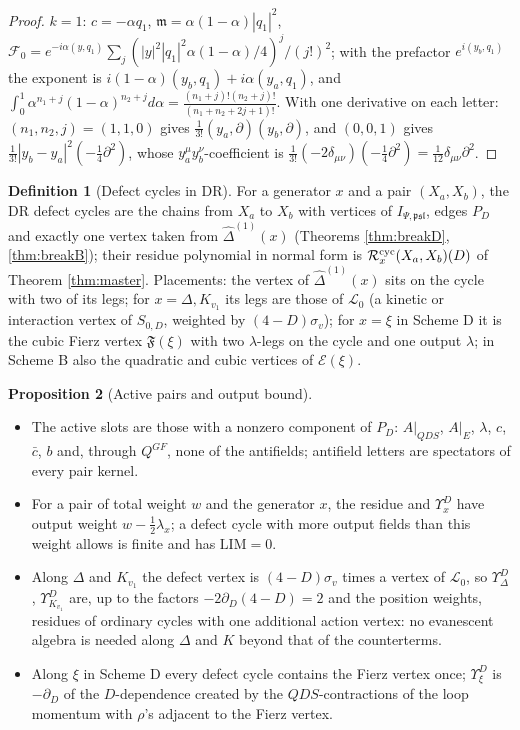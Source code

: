 \documentclass[11pt]{article}
\theoremstyle{definition}
\newtheorem{definition}{Definition}[section]
\newtheorem{proposition}[definition]{Proposition}
\numberwithin{equation}{section}
\begin{document}
\begin{proof}
$k=1$: $c=-\alpha q_1$, $\mathfrak m=\alpha(1-\alpha)|q_1|^2$, $\mathcal F_0=e^{-i\alpha(y,q_1)}\sum_j(|y|^2|q_1|^2\alpha(1-\alpha)/4)^j/(j!)^2$; with the prefactor $e^{i(y_b,q_1)}$ the exponent is $i(1-\alpha)(y_b,q_1)+i\alpha(y_a,q_1)$, and $\int_0^1\alpha^{n_1+j}(1-\alpha)^{n_2+j}d\alpha=\frac{(n_1+j)!(n_2+j)!}{(n_1+n_2+2j+1)!}$. With one derivative on each letter: $(n_1,n_2,j)=(1,1,0)$ gives $\frac1{3!}(y_a,\partial)(y_b,\partial)$, and $(0,0,1)$ gives $\frac1{3!}|y_b-y_a|^2(-\frac14\partial^2)$, whose $y_a^\mu y_b^\nu$-coefficient is $\frac1{3!}(-2\delta_{\mu\nu})(-\frac14\partial^2)=\frac1{12}\delta_{\mu\nu}\partial^2$.
\end{proof}

\begin{definition}[Defect cycles in DR]
\label{def:defcyc}
For a generator $x$ and a pair $(X_a,X_b)$, the DR defect cycles are the chains from $X_a$ to $X_b$ with vertices of $I_{\Psi,\mathfrak{psl}}$, edges $P_D$ and exactly one vertex taken from $\widehat\Delta^{(1)}(x)$ (Theorems \ref{thm:breakD}, \ref{thm:breakB}); their residue polynomial in normal form is $\mathcal R^{\rm cyc}_x(X_a,X_b)(D)$ of Theorem \ref{thm:master}. Placements: the vertex of $\widehat\Delta^{(1)}(x)$ sits on the cycle with two of its legs; for $x=\Delta,K_{v_1}$ its legs are those of $\mathscr L_0$ (a kinetic or interaction vertex of $S_{0,D}$, weighted by $(4-D)\sigma_v$); for $x=\xi$ in Scheme D it is the cubic Fierz vertex $\mathfrak F(\xi)$ with two $\lambda$-legs on the cycle and one output $\lambda$; in Scheme B also the quadratic and cubic vertices of $\mathcal E(\xi)$.
\end{definition}

\begin{proposition}[Active pairs and output bound]
\label{prop:active}
\mbox{}\begin{itemize}
\item[(i)] The active slots are those with a nonzero component of $P_D$: $A|_{QDS}$, $A|_E$, $\lambda$, $c$, $\bar c$, $b$ and, through $Q^{GF}$, none of the antifields; antifield letters are spectators of every pair kernel.
\item[(ii)] For a pair of total weight $w$ and the generator $x$, the residue and $\Upsilon^D_x$ have output weight $w-\frac12\lambda_x$; a defect cycle with more output fields than this weight allows is finite and has $\mathrm{LIM}=0$.
\item[(iii)] Along $\Delta$ and $K_{v_1}$ the defect vertex is $(4-D)\sigma_v$ times a vertex of $\mathscr L_0$, so $\Upsilon^D_\Delta$, $\Upsilon^D_{K_{v_1}}$ are, up to the factors $-2\partial_D(4-D)=2$ and the position weights, residues of ordinary cycles with one additional action vertex: no evanescent algebra is needed along $\Delta$ and $K$ beyond that of the counterterms.
\item[(iv)] Along $\xi$ in Scheme D every defect cycle contains the Fierz vertex once; $\Upsilon^D_\xi$ is $-\partial_D$ of the $D$-dependence created by the $QDS$-contractions of the loop momentum with $\rho$'s adjacent to the Fierz vertex.
\end{itemize}
\end{proposition}
\end{document}
